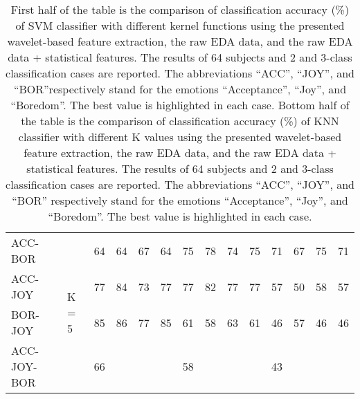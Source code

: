 \begin{sidewaystable}[]
{\begin{tabular}{llllllllllllll}
		ACC-BOR     & \multirow{4}{*}{K = 5} & 64       & 64  & 67        & 64     & 75             & 78       & 74             & 75          & 71       & 67  & 75        & 71     \\
		ACC-JOY     &                        & 77       & 84  & 73        & 77     & 77             & 82       & 77             & 77          & 57       & 50  & 58        & 57     \\
		BOR-JOY     &                        & 85       & 86  & 77        & 85     & 61             & 58       & 63             & 61          & 46       & 57  & 46        & 46     \\
		ACC-JOY-BOR &                        & 66       &     &           &        & 58             &          &                &             & 43       &     &           &        \\ \hline
	\end{tabular}
}
\caption{First half of the table is the comparison of classification accuracy (\%) of SVM classifier with different kernel 
		functions using the presented wavelet-based feature extraction, the raw EDA data, and the raw EDA data + statistical 
		features. The results of 64 subjects and 2 and 3-class classification cases are reported. The abbreviations “ACC”, 
		“JOY”, and “BOR”respectively stand for the emotions “Acceptance”, “Joy”, and “Boredom”. The best value is highlighted 
		in each case.
		Bottom half of the table is the comparison of classification accuracy (\%) of KNN classifier with different K values 
		using the presented wavelet-based feature extraction, the raw EDA data,	and the raw EDA data + statistical features. 
		The results of 64 subjects and 2 and 3-class classification cases are reported. The abbreviations “ACC”, “JOY”, and 
		“BOR” respectively stand for the emotions “Acceptance”, “Joy”, and “Boredom”. The best value is highlighted in each case.}
\label{svmknn}
\end{sidewaystable}

